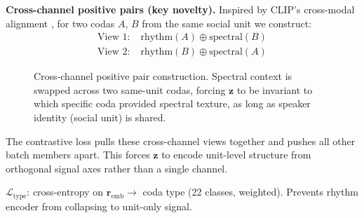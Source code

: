 \documentclass[9pt,a4paper,twocolumn,twoside]{rho-class/rho}
\begin{document}
\textbf{Cross-channel positive pairs (key novelty).} Inspired by CLIP's cross-modal alignment \cite{radford2021clip}, for two codas $A$, $B$ from the same social unit we construct:
\begin{align*}
\text{View 1:}&\;\mathrm{rhythm}(A) \oplus \mathrm{spectral}(B) \\
\text{View 2:}&\;\mathrm{rhythm}(B) \oplus \mathrm{spectral}(A)
\end{align*}

\begin{figure}[H]
\centering
{}
\caption{Cross-channel positive pair construction. Spectral context is swapped across two same-unit codas, forcing $\mathbf{z}$ to be invariant to which specific coda provided spectral texture, as long as speaker identity (social unit) is shared.}
\label{fig:crosspairs}
\end{figure}

The contrastive loss pulls these cross-channel views together and pushes all other batch members apart. This forces $\mathbf{z}$ to encode unit-level structure from orthogonal signal axes rather than a single channel.

\textbf{$\mathcal{L}_\text{type}$}: cross-entropy on $\mathbf{r}_\text{emb} \to$ coda type (22 classes, weighted). Prevents rhythm encoder from collapsing to unit-only signal.
\end{document}
